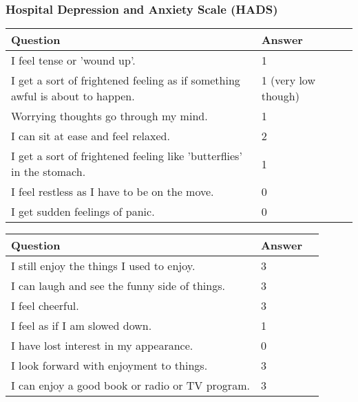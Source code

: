 \subsubsection{Hospital Depression and Anxiety Scale (HADS)}
\begin{table}[H]
    \centering
    \renewcommand{\arraystretch}{1.2}
    \begin{tabularx}{\textwidth}{|l|X|l|}
        \hline
        \textbf{Question} & \textbf{Answer} \\ \hline
        I feel tense or 'wound up'. &
        1
        \\ \hline
        I get a sort of frightened feeling as if something awful is about to happen. &
        1 (very low though)
        \\ \hline
        Worrying thoughts go through my mind. &
        1
        \\ \hline
        I can sit at ease and feel relaxed. &
        2
        \\ \hline
        I get a sort of frightened feeling like 'butterflies' in the stomach. &
        1
        \\ \hline
        I feel restless as I have to be on the move. &
        0
        \\ \hline
        I get sudden feelings of panic. &
        0
        \\ \hline
    \end{tabularx}
\end{table}
\begin{table}[H]
    \centering
    \renewcommand{\arraystretch}{1.2}
    \begin{tabularx}{\textwidth}{|l|X|l|}
        \hline
        \textbf{Question} & \textbf{Answer} \\ \hline
        I still enjoy the things I used to enjoy. &
        3
        \\ \hline
        I can laugh and see the funny side of things. &
        3
        \\ \hline
        I feel cheerful. &
        3
        \\ \hline
        I feel as if I am slowed down. &
        1
        \\ \hline
        I have lost interest in my appearance. &
        0
        \\ \hline
        I look forward with enjoyment to things. &
        3
        \\ \hline
        I can enjoy a good book or radio or TV program. &
        3
        \\ \hline
    \end{tabularx}
\end{table}

